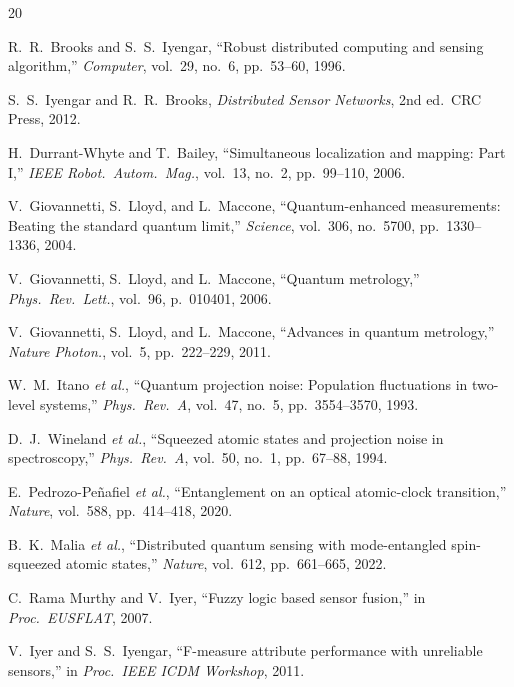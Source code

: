 \documentclass[twocolumn,11pt]{article}
\begin{document}
\begin{thebibliography}{20}

R.~R.~Brooks and S.~S.~Iyengar,
``Robust distributed computing and sensing algorithm,''
\textit{Computer}, vol.~29, no.~6, pp.~53--60, 1996.

S.~S.~Iyengar and R.~R.~Brooks,
\textit{Distributed Sensor Networks},
2nd ed.\ CRC Press, 2012.

H.~Durrant-Whyte and T.~Bailey,
``Simultaneous localization and mapping: Part I,''
\textit{IEEE Robot.\ Autom.\ Mag.}, vol.~13, no.~2, pp.~99--110, 2006.

V.~Giovannetti, S.~Lloyd, and L.~Maccone,
``Quantum-enhanced measurements: Beating the standard quantum limit,''
\textit{Science}, vol.~306, no.~5700, pp.~1330--1336, 2004.

V.~Giovannetti, S.~Lloyd, and L.~Maccone,
``Quantum metrology,''
\textit{Phys.\ Rev.\ Lett.}, vol.~96, p.~010401, 2006.

V.~Giovannetti, S.~Lloyd, and L.~Maccone,
``Advances in quantum metrology,''
\textit{Nature Photon.}, vol.~5, pp.~222--229, 2011.

W.~M.~Itano \textit{et al.},
``Quantum projection noise: Population fluctuations in two-level systems,''
\textit{Phys.\ Rev.\ A}, vol.~47, no.~5, pp.~3554--3570, 1993.

D.~J.~Wineland \textit{et al.},
``Squeezed atomic states and projection noise in spectroscopy,''
\textit{Phys.\ Rev.\ A}, vol.~50, no.~1, pp.~67--88, 1994.

E.~Pedrozo-Pe\~{n}afiel \textit{et al.},
``Entanglement on an optical atomic-clock transition,''
\textit{Nature}, vol.~588, pp.~414--418, 2020.

B.~K.~Malia \textit{et al.},
``Distributed quantum sensing with mode-entangled spin-squeezed atomic states,''
\textit{Nature}, vol.~612, pp.~661--665, 2022.


C.~Rama Murthy and V.~Iyer,
``Fuzzy logic based sensor fusion,''
in \textit{Proc.\ EUSFLAT}, 2007.

V.~Iyer and S.~S.~Iyengar,
``F-measure attribute performance with unreliable sensors,''
in \textit{Proc.\ IEEE ICDM Workshop}, 2011.


\end{thebibliography}
\end{document}
